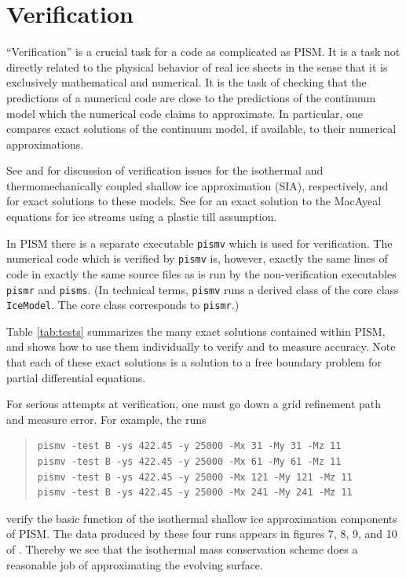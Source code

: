 \documentclass[11pt,final]{amsart}
\begin{document}
\clearpage\newpage
\section{Verification}\label{sect:verif}

``Verification'' is a crucial task for a code as complicated as PISM.  It is a task not directly related to the physical behavior of real ice sheets in the sense that it is exclusively mathematical and numerical.  It is the task of checking that the predictions of a numerical code are close to the predictions of the continuum model which the numerical code claims to approximate.  In particular, one compares exact solutions of the continuum model, if available, to their numerical approximations.

See \cite{BLKCB} and \cite{BBL} for discussion of verification issues for the isothermal and thermomechanically coupled shallow ice approximation (SIA), respectively, and for exact solutions to these models.  See \cite{SchoofStream} for an exact solution to the MacAyeal equations for ice streams using a plastic till assumption.

In PISM there is a separate executable \verb|pismv| which is used for verification.  The numerical code which is verified by \verb|pismv| is, however, exactly the same lines of code in exactly the same source files as is run by the non-verification executables \verb|pismr| and \verb|pisms|.  (In technical terms, \verb|pismv| runs a derived class of the core class \verb|IceModel|.  The core class corresponds to \verb|pismr|.)

Table \ref{tab:tests} summarizes the many exact solutions contained within PISM, and shows how to use them individually to verify and to measure accuracy.   Note that each of these exact solutions is a solution to a free boundary problem for partial differential equations.

For serious attempts at verification, one must go down a grid refinement path and measure error.  For example, the runs
\begin{quote}\small\begin{verbatim}
pismv -test B -ys 422.45 -y 25000 -Mx 31 -My 31 -Mz 11
pismv -test B -ys 422.45 -y 25000 -Mx 61 -My 61 -Mz 11
pismv -test B -ys 422.45 -y 25000 -Mx 121 -My 121 -Mz 11
pismv -test B -ys 422.45 -y 25000 -Mx 241 -My 241 -Mz 11
\end{verbatim}
\normalsize\end{quote}
verify the basic function of the isothermal shallow ice approximation components of PISM.  The data produced by these four runs appears in figures 7, 8, 9, and 10 of \cite{BLKCB}.  Thereby we see that the isothermal mass conservation scheme does a reasonable job of approximating the evolving surface.
\end{document}
